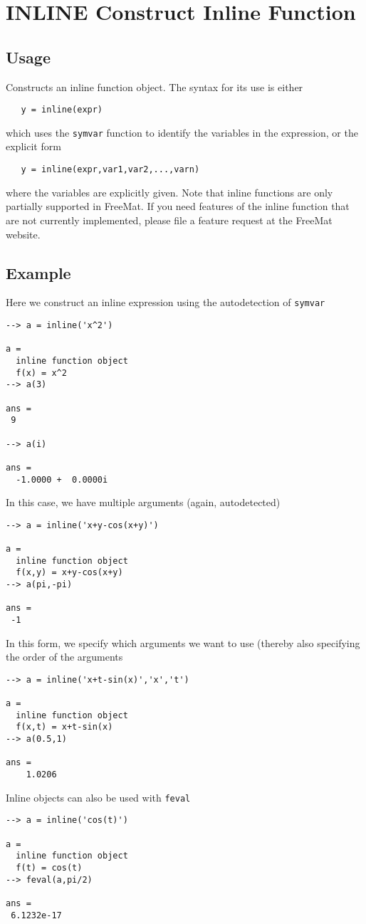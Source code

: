 \section{INLINE Construct Inline Function}

\subsection{Usage}

Constructs an inline function object.  The syntax for its use is
either
\begin{verbatim}
   y = inline(expr)
\end{verbatim}
which uses the \verb|symvar| function to identify the variables in the
expression, or the explicit form
\begin{verbatim}
   y = inline(expr,var1,var2,...,varn)
\end{verbatim}
where the variables are explicitly given.  Note that inline functions
are only partially supported in FreeMat.  If you need features of the
inline function that are not currently implemented, please file a
feature request at the FreeMat website.
\subsection{Example}

Here we construct an inline expression using the autodetection 
of \verb|symvar|
\begin{verbatim}
--> a = inline('x^2')

a = 
  inline function object
  f(x) = x^2
--> a(3)

ans = 
 9 

--> a(i)

ans = 
  -1.0000 +  0.0000i 
\end{verbatim}
In this case, we have multiple arguments (again, autodetected)
\begin{verbatim}
--> a = inline('x+y-cos(x+y)')

a = 
  inline function object
  f(x,y) = x+y-cos(x+y)
--> a(pi,-pi)

ans = 
 -1 
\end{verbatim}
In this form, we specify which arguments we want to use (thereby
also specifying the order of the arguments
\begin{verbatim}
--> a = inline('x+t-sin(x)','x','t')

a = 
  inline function object
  f(x,t) = x+t-sin(x)
--> a(0.5,1)

ans = 
    1.0206 
\end{verbatim}
Inline objects can also be used with \verb|feval|
\begin{verbatim}
--> a = inline('cos(t)')

a = 
  inline function object
  f(t) = cos(t)
--> feval(a,pi/2)

ans = 
 6.1232e-17 
\end{verbatim}
